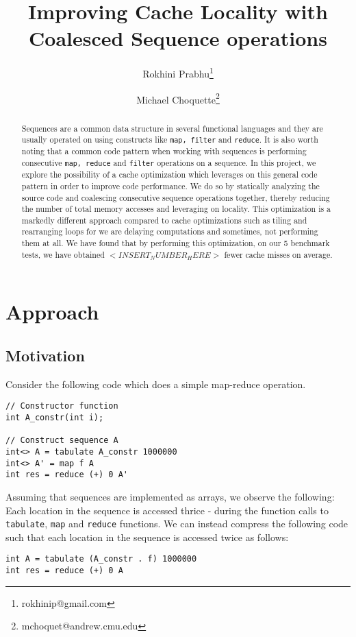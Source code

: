\documentclass[a4paper,twocolumn]{article}
\title{Improving Cache Locality with Coalesced Sequence operations}
\date{\vspace{-5ex}}
\author{Rokhini Prabhu\thanks{rokhinip@gmail.com} }
\author{Michael Choquette\thanks{mchoquet@andrew.cmu.edu}}
\affil{Carnegie Mellon University}
\newcommand{\sml}[1]{\texttt{#1}}
\begin{document}
\maketitle

\begin{abstract}
Sequences are a common data structure in several functional languages and they
are usually operated on using constructs like \sml{map, filter} and
\sml{reduce}. It is also worth noting that a common code pattern when working
with sequences is performing consecutive \sml{map, reduce} and \sml{filter}
operations on a sequence. In this project, we explore the possibility of a
cache optimization which leverages on this general code pattern in order to
improve code performance. We do so by statically analyzing the source code and
coalescing consecutive sequence operations together, thereby reducing the number
of total memory accesses and leveraging on locality. This optimization is a
markedly different approach compared to cache optimizations such as tiling and
rearranging loops for we are delaying computations and sometimes,
not performing them at all. We have found that by performing this
optimization, on our 5 benchmark tests, we have obtained $<INSERT_NUMBER_HERE>$
fewer cache misses on average.
\end{abstract}

\section{Approach}

\subsection{Motivation}
Consider the following code which does a simple map-reduce operation.

\begin{verbatim}
// Constructor function
int A_constr(int i);

// Construct sequence A
int<> A = tabulate A_constr 1000000
int<> A' = map f A
int res = reduce (+) 0 A'
\end{verbatim}

Assuming that sequences are implemented as arrays, we observe the following:
Each location in the sequence is accessed thrice - during the function calls to
\sml{tabulate}, \sml{map} and \sml{reduce} functions. We can instead compress
the following code such that each location in the sequence is accessed twice
as follows:
\begin{verbatim}
int A = tabulate (A_constr . f) 1000000
int res = reduce (+) 0 A
\end{verbatim}
\end{document}

